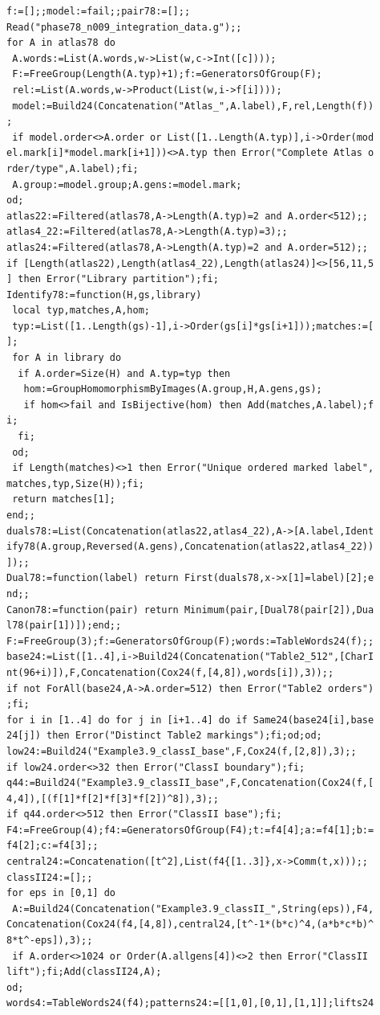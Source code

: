 \documentclass[
  11pt,
  a4paper,
]{article}
\begin{document}
\begin{verbatim}
f:=[];;model:=fail;;pair78:=[];;
Read("phase78_n009_integration_data.g");;
for A in atlas78 do
 A.words:=List(A.words,w->List(w,c->Int([c])));
 F:=FreeGroup(Length(A.typ)+1);f:=GeneratorsOfGroup(F);
 rel:=List(A.words,w->Product(List(w,i->f[i])));
 model:=Build24(Concatenation("Atlas_",A.label),F,rel,Length(f))
;
 if model.order<>A.order or List([1..Length(A.typ)],i->Order(mod
el.mark[i]*model.mark[i+1]))<>A.typ then Error("Complete Atlas o
rder/type",A.label);fi;
 A.group:=model.group;A.gens:=model.mark;
od;
atlas22:=Filtered(atlas78,A->Length(A.typ)=2 and A.order<512);;
atlas4_22:=Filtered(atlas78,A->Length(A.typ)=3);;
atlas24:=Filtered(atlas78,A->Length(A.typ)=2 and A.order=512);;
if [Length(atlas22),Length(atlas4_22),Length(atlas24)]<>[56,11,5
] then Error("Library partition");fi;
Identify78:=function(H,gs,library)
 local typ,matches,A,hom;
 typ:=List([1..Length(gs)-1],i->Order(gs[i]*gs[i+1]));matches:=[
];
 for A in library do
  if A.order=Size(H) and A.typ=typ then
   hom:=GroupHomomorphismByImages(A.group,H,A.gens,gs);
   if hom<>fail and IsBijective(hom) then Add(matches,A.label);f
i;
  fi;
 od;
 if Length(matches)<>1 then Error("Unique ordered marked label",
matches,typ,Size(H));fi;
 return matches[1];
end;;
duals78:=List(Concatenation(atlas22,atlas4_22),A->[A.label,Ident
ify78(A.group,Reversed(A.gens),Concatenation(atlas22,atlas4_22))
]);;
Dual78:=function(label) return First(duals78,x->x[1]=label)[2];e
nd;;
Canon78:=function(pair) return Minimum(pair,[Dual78(pair[2]),Dua
l78(pair[1])]);end;;
F:=FreeGroup(3);f:=GeneratorsOfGroup(F);words:=TableWords24(f);;
base24:=List([1..4],i->Build24(Concatenation("Table2_512",[CharI
nt(96+i)]),F,Concatenation(Cox24(f,[4,8]),words[i]),3));;
if not ForAll(base24,A->A.order=512) then Error("Table2 orders")
;fi;
for i in [1..4] do for j in [i+1..4] do if Same24(base24[i],base
24[j]) then Error("Distinct Table2 markings");fi;od;od;
low24:=Build24("Example3.9_classI_base",F,Cox24(f,[2,8]),3);;
if low24.order<>32 then Error("ClassI boundary");fi;
q44:=Build24("Example3.9_classII_base",F,Concatenation(Cox24(f,[
4,4]),[(f[1]*f[2]*f[3]*f[2])^8]),3);;
if q44.order<>512 then Error("ClassII base");fi;
F4:=FreeGroup(4);f4:=GeneratorsOfGroup(F4);t:=f4[4];a:=f4[1];b:=
f4[2];c:=f4[3];;
central24:=Concatenation([t^2],List(f4{[1..3]},x->Comm(t,x)));;
classII24:=[];;
for eps in [0,1] do
 A:=Build24(Concatenation("Example3.9_classII_",String(eps)),F4,
Concatenation(Cox24(f4,[4,8]),central24,[t^-1*(b*c)^4,(a*b*c*b)^
8*t^-eps]),3);;
 if A.order<>1024 or Order(A.allgens[4])<>2 then Error("ClassII 
lift");fi;Add(classII24,A);
od;
words4:=TableWords24(f4);patterns24:=[[1,0],[0,1],[1,1]];lifts24

\end{verbatim}
\end{document}
